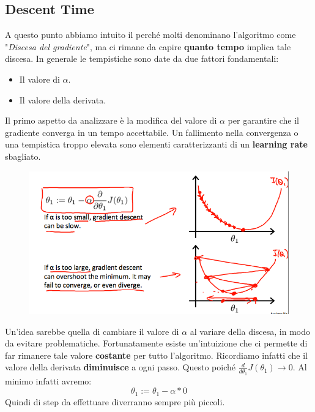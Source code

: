 \subsection{Descent Time}
A questo punto abbiamo intuito il perché molti denominano l'algoritmo come "\textit{Discesa del gradiente}", ma ci rimane da capire \textbf{quanto tempo} implica tale discesa.
In generale le tempistiche sono date da due fattori fondamentali:
\begin{itemize}
    \item Il valore di $\alpha$.
    \item Il valore della derivata.
\end{itemize}
Il primo aspetto da analizzare è la modifica del valore di $\alpha$ per garantire che il gradiente converga in un tempo accettabile. Un fallimento nella convergenza o una tempistica troppo elevata sono elementi caratterizzanti di un \textbf{learning rate} sbagliato.
\begin{figure}[h!]
    \centering
    \includegraphics[width=1\textwidth]{img/UJpiD6GWEeai9RKvXdDYag_3c3ad6625a2a4ec8456f421a2f4daf2e_Screenshot-2016-11-03-00.05.27.png}
    \caption{}\label{GradientDescent3}
\end{figure}
Un'idea sarebbe quella di cambiare il valore di $\alpha$ al variare della discesa, in modo da evitare problematiche. Fortunatamente esiste un'intuizione che ci permette di far rimanere tale valore \textbf{costante} per tutto l'algoritmo. Ricordiamo infatti che il valore della derivata \textbf{diminuisce} a ogni passo. Questo poiché $\frac{d}{d\theta_1} J(\theta_1) \to 0$. Al minimo infatti avremo: 
\[\theta_1:=\theta_1-\alpha * 0\]
Quindi di step da effettuare diverranno sempre più piccoli.
